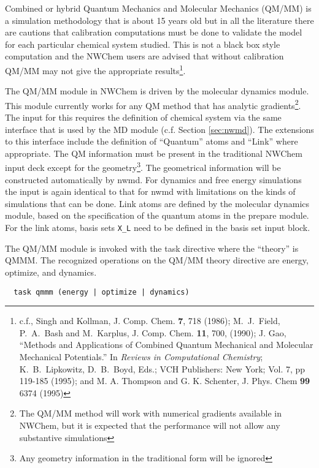
\label{sec:qmmm}

Combined or hybrid Quantum Mechanics and Molecular Mechanics (QM/MM)
is a simulation methodology that is about 15 years old but in all the
literature there are cautions that calibration computations must be
done to validate the model for each particular chemical system
studied.  This is not a black box style computation and the NWChem
users are advised that without calibration QM/MM may not give the
appropriate results\footnote{c.f., Singh and Kollman, J. Comp. Chem.
  {\bf 7}, 718 (1986); M.~J.~Field, P.~A.~Bash and M.~Karplus, J.
  Comp. Chem. {\bf 11}, 700, (1990); J. Gao, ``Methods and
  Applications of Combined Quantum Mechanical and Molecular Mechanical
  Potentials.'' In {\it Reviews in Computational Chemistry};
  K.~B.~Lipkowitz, D.~B.~Boyd, Eds.; VCH Publishers: New York;
  Vol. 7, pp 119-185 (1995); and M. A. Thompson and G. K. Schenter, J.
  Phys. Chem {\bf 99} 6374 (1995) }.

The QM/MM module in NWChem is driven by the molecular dynamics module.
This module currently works for any QM method that has
analytic gradients\footnote{The QM/MM method will work with numerical
  gradients available in NWChem, but it is expected that the
  performance will not allow any substantive simulations}.  The input
for this requires the definition of chemical system via the same
interface that is used by the MD module (c.f. Section
\ref{sec:nwmd}).  The extensions to this interface include the
definition of ``Quantum'' atoms and ``Link'' where appropriate.  The
QM information must be present in the traditional NWChem input deck
except for the geometry\footnote{Any geometry information in the
  traditional form will be ignored}.  The geometrical information will
be constructed automatically by nwmd.  For dynamics and free energy
simulations the input is again identical to that for nwmd with
limitations on the kinds of simulations that can be done.
Link atoms are defined by the molecular dynamics module, based on
the specification of the quantum atoms in the prepare module. For
the link atoms, basis sets \verb+X_L+ need to be defined in the
basis set input block.

The QM/MM module is invoked with the task directive where the
``theory'' is QMMM.  The recognized operations on the QM/MM theory
directive are energy, optimize, and dynamics.

\begin{verbatim}
  task qmmm (energy | optimize | dynamics)
\end{verbatim}


